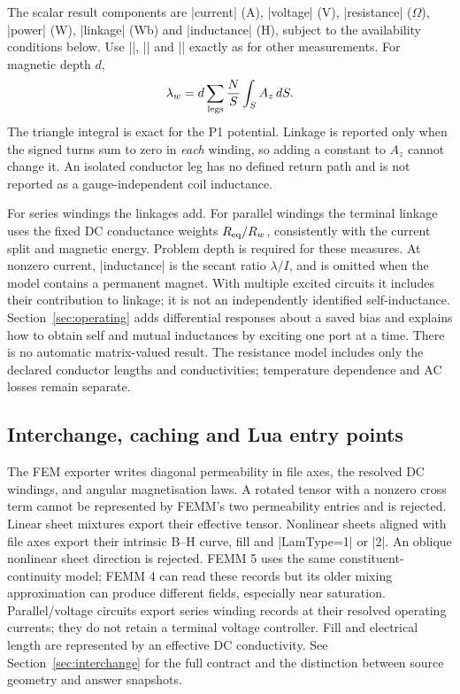 The scalar result components are |current| (A), |voltage| (V), |resistance|
($\Omega$), |power| (W), |linkage| (Wb) and |inductance| (H), subject to the
availability conditions below. Use |\femmresult|, |\femmvalue| and
|\femmresultplot| exactly as for other measurements. For magnetic depth $d$,
\[
 \lambda_w=d\sum_{\rm legs}\frac{N}{S}\int_S A_z\,dS.
\]
The triangle integral is exact for the P1 potential. Linkage is reported only
when the signed turns sum to zero in \emph{each} winding, so adding a constant
to $A_z$ cannot change it. An isolated conductor leg has no defined return path
and is not reported as a gauge-independent coil inductance.

For series windings the linkages add. For parallel windings the terminal linkage
uses the fixed DC conductance weights $R_{\rm eq}/R_w$, consistently with the
current split and magnetic energy. Problem depth is required for these measures.
At nonzero current, |inductance| is the secant ratio $\lambda/I$, and is omitted
when the model contains a permanent magnet. With multiple excited circuits it
includes their contribution to linkage; it is not an independently identified
self-inductance. Section~\ref{sec:operating} adds differential responses about a
saved bias and explains how to obtain self and mutual inductances by exciting
one port at a time. There is no automatic matrix-valued result. The resistance model includes only the declared conductor
lengths and conductivities; temperature dependence and AC losses remain separate.

\subsection{Interchange, caching and Lua entry points}
The FEM exporter writes diagonal permeability in file axes, the resolved DC
windings, and angular magnetisation laws. A rotated tensor with a nonzero cross
term cannot be represented by FEMM's two permeability entries and is rejected.
Linear sheet mixtures export their effective tensor. Nonlinear sheets aligned
with file axes export their intrinsic B--H curve, fill and |LamType=1| or |2|.
An oblique nonlinear sheet direction is rejected. FEMM 5 uses the same
constituent-continuity model; FEMM 4 can read these records but its older mixing
approximation can produce different fields, especially near saturation. Parallel/voltage circuits
export series winding records at their resolved operating currents; they do not
retain a terminal voltage controller. Fill and electrical length are represented
by an effective DC conductivity. See Section~\ref{sec:interchange} for the full
contract and the distinction between source geometry and answer snapshots.

